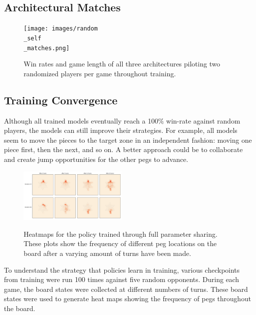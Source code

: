 \documentclass[12pt, a4paper, twocolumn]{article}
\begin{document}
\subsection{Architectural Matches}

\begin{figure}[ht]
  \centering
    \texttt{[image: images/random\\\_self\\\_matches.png]}
  \caption{Win rates and game length of all three architectures piloting two randomized players per game throughout training.}\label{fig:archmatches}
\end{figure}


\subsection{Training Convergence}

Although all trained models eventually reach a 100\% win-rate against random players, the models can still improve their strategies. For example, all models seem to move the pieces to the target zone in an independent fashion: moving one piece first, then the next, and so on. A better approach could be to collaborate and create jump opportunities for the other pegs to advance.


\begin{figure}[ht]
  \centering
    \includegraphics[width=0.47\textwidth]{images/random_heatmap.png}
  \label{fig:heatmap}
  \caption{Heatmaps for the policy trained through full parameter sharing. These plots show the frequency of different peg locations on the board after a varying amount of turns have been made.}
\end{figure}

To understand the strategy that policies learn in training, various checkpoints from training were run 100 times against five random opponents. During each game, the board states were collected at different numbers of turns. These board states were used to generate heat maps showing the frequency of pegs throughout the board.
\end{document}
